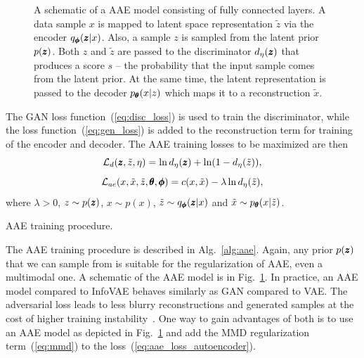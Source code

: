 \begin{figure}
\centering{}\caption{A schematic of a AAE model consisting of fully connected layers. A
data sample $x$ is mapped to latent space representation $\tilde{z}$
via the encoder $q_{\pmb{{\phi}}}(\pmb{{z}}|x)$. Also, a sample $z$ is sampled from
the latent prior $p(\pmb{{z}})$. Both $z$ and $\tilde{z}$ are passed to
the discriminator $d_{\eta}(\pmb{{z}})$ that produces a score $s$ -- the
probability that the input sample comes from the latent prior. At
the same time, the latent representation is passed to the decoder
$p_{\pmb{{\theta}}}(x|z)$ which maps it to a reconstruction $\tilde{x}$.}
\label{fig:aae}
\end{figure}

The GAN loss function~(\ref{eq:disc_loss}) is used to train the
discriminator, while the loss function~(\ref{eq:gen_loss}) is added
to the reconstruction term for training of the encoder and decoder.
The AAE training losses to be maximized are then
\begin{equation}
\mathcal{L}_{d}(\pmb{{z}},\tilde{z},\eta)=\ln d_{\eta}(\pmb{{z}})+\ln(1-d_{\eta}(\tilde{z})),\label{eq:aae_loss_disc}
\end{equation}
\begin{equation}
\mathcal{L}_{ae}(x,\tilde{x},\tilde{z},\pmb{{\theta}},\pmb{{\phi}})=c(x,\tilde{x})-\lambda\ln d_{\eta}(\tilde{z}),\label{eq:aae_loss_autoencoder}
\end{equation}
where $\lambda>0$, $z\sim p(\pmb{{z}})$, $x\sim p(x)$, $\tilde{z}\sim q_{\pmb{{\phi}}}(\pmb{{z}}|x)$
and $\tilde{x}\sim p_{\pmb{{\theta}}}(x|\tilde{z})$.

\begin{algorithm}


\caption{AAE training procedure.}
\label{alg:aae}
\end{algorithm}

The AAE training procedure is described in Alg.~\ref{alg:aae}.
Again, any prior $p(\pmb{{z}})$ that we can sample from is suitable for the
regularization of AAE, even a multimodal one. A schematic of the AAE
model is in Fig.~\ref{fig:aae}. In practice, an AAE model compared
to InfoVAE behaves similarly as GAN compared to VAE. The adversarial
loss leads to less blurry reconstructions and generated samples at
the cost of higher training instability~\cite{tolstikhin2017wasserstein}.
One way to gain advantages of both is to use an AAE model as depicted
in Fig.~\ref{fig:aae} and add the MMD regularization term~(\ref{eq:mmd})
to the loss~(\ref{eq:aae_loss_autoencoder}).


